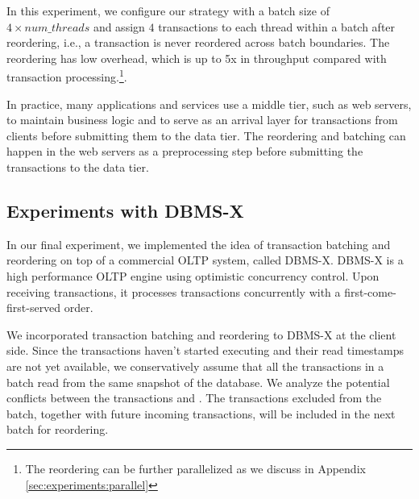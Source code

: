 {In this experiment, we configure our strategy with a batch size of $4\times num\_threads$ and assign $4$ transactions to each thread within a batch after reordering, i.e., a transaction is never reordered across batch boundaries. The reordering has low overhead, which is up to 5x in throughput compared with transaction processing.\footnote{The reordering can be further parallelized as we discuss in Appendix \ref{sec:experiments:parallel}}.

In practice, many applications and services use a middle tier, such as web servers, to maintain business logic and to serve as an arrival layer for transactions from clients before submitting them to the data tier. The reordering and batching can happen in the web servers as a preprocessing step before submitting the transactions to the data tier.
}

\subsection{Experiments with DBMS-X}
\label{subsec:experiment:compare}

In our final experiment, we implemented the idea of transaction batching and reordering on top of a commercial OLTP system, called DBMS-X. DBMS-X is a high performance OLTP engine using optimistic concurrency control. Upon receiving transactions, it processes transactions concurrently with a first-come-first-served order.


We incorporated transaction batching and reordering to DBMS-X at the client side.
 Since the transactions haven't started executing and their read timestamps are not yet available, we conservatively assume that all the transactions in a batch read from the same snapshot of the database. We analyze the potential conflicts between the transactions and . The transactions excluded from the batch, together with future incoming transactions, will be included in the next batch for reordering.

